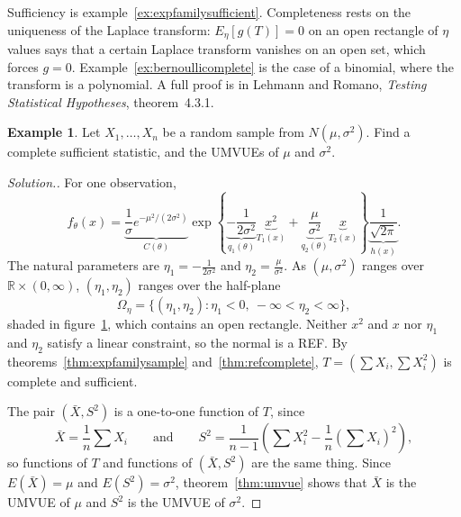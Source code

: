 \documentclass[12pt,a4paper]{report}
\theoremstyle{definition}
\newtheorem{exa}[thm]{Example}
\newenvironment{solution}
  {\renewcommand{\qedsymbol}{}\begin{proof}[\textit{Solution}.]}
  {\end{proof}}
\begin{document}
Sufficiency is example~\ref{ex:expfamilysufficient}. Completeness rests on the
uniqueness of the Laplace transform: $E_\eta\left[g(T)\right] = 0$ on an open
rectangle of $\eta$ values says that a certain Laplace transform vanishes on an
open set, which forces $g = 0$. Example~\ref{ex:bernoullicomplete} is the case of a
binomial, where the transform is a polynomial. A full proof is in Lehmann and
Romano, \emph{Testing Statistical Hypotheses}, theorem~4.3.1.

\begin{exa}
\label{ex:normalumvue}
Let $X_1, \dots, X_n$ be a random sample from $N(\mu, \sigma^2)$. Find a complete
sufficient statistic, and the UMVUEs of $\mu$ and $\sigma^2$.
\end{exa}

\begin{solution}
For one observation,
\[f_\theta(x) = \underbrace{\frac{1}{\sigma}e^{-\mu^2/(2\sigma^2)}}_{C(\theta)}
\exp\left\{\underbrace{-\frac{1}{2\sigma^2}}_{q_1(\theta)}\underbrace{x^2}_{T_1(x)}
+ \underbrace{\frac{\mu}{\sigma^2}}_{q_2(\theta)}\underbrace{x}_{T_2(x)}\right\}\underbrace{\frac{1}{\sqrt{2\pi}}}_{h(x)} .\]
The natural parameters are $\eta_1 = -\frac{1}{2\sigma^2}$ and $\eta_2 = \frac{\mu}{\sigma^2}$.
As $(\mu, \sigma^2)$ ranges over $\mathbb{R}\times(0, \infty)$, $(\eta_1, \eta_2)$
ranges over the half-plane
\[\Omega_\eta = \{(\eta_1, \eta_2) : \eta_1<0,\ -\infty<\eta_2<\infty\},\]
shaded in figure~\ref{fig:halfplane}, which contains an open rectangle. Neither
$x^2$ and $x$ nor $\eta_1$ and $\eta_2$ satisfy a linear constraint, so the normal
is a REF. By theorems~\ref{thm:expfamilysample} and~\ref{thm:refcomplete},
$T = \left(\sum X_i, \sum X_i^2\right)$ is complete and sufficient.

The pair $(\bar X, S^2)$ is a one-to-one function of $T$, since
\[\bar X = \frac1n\sum X_i\qquad\text{and}\qquad S^2 = \frac{1}{n - 1}\left(\sum X_i^2 - \frac1n\left(\sum X_i\right)^2\right),\]
so functions of $T$ and functions of $(\bar X, S^2)$ are the same thing. Since
$E(\bar X) = \mu$ and $E(S^2) = \sigma^2$, theorem~\ref{thm:umvue} shows that
$\bar X$ is the UMVUE of $\mu$ and $S^2$ is the UMVUE of $\sigma^2$.
\end{solution}

\begin{figure}[H]
\centering
{}
\label{fig:halfplane}
\end{figure}
\end{document}
